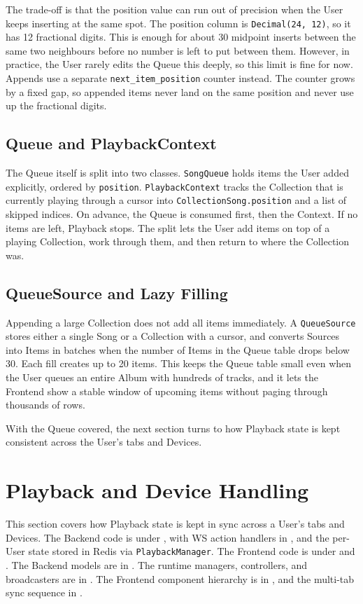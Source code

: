 The trade-off is that the position value can run out of precision
when the User keeps inserting at the same spot. The position column
is \texttt{Decimal(24, 12)}, so it has 12 fractional digits. This is
enough for about 30 midpoint inserts between the same two neighbours
before no number is left to put between them. However, in practice,
the User rarely edits the Queue this deeply, so this limit is fine
for now. Appends use a separate \texttt{next\_item\_position} counter
instead. The counter grows by a fixed gap, so appended items never
land on the same position and never use up the fractional digits.

\subsection{Queue and PlaybackContext}
The Queue itself is split into two classes. \texttt{SongQueue} holds
items the User added explicitly, ordered by \texttt{position}.
\texttt{PlaybackContext} tracks the Collection that is currently
playing through a cursor into \texttt{CollectionSong.position} and a
list of skipped indices. On advance, the Queue is consumed first,
then the Context. If no items are left, Playback stops. The split
lets the User add items on top of a playing Collection, work through
them, and then return to where the Collection was.

\subsection{QueueSource and Lazy Filling}
Appending a large Collection does not add all items immediately.
A \texttt{QueueSource} stores either a single Song or a
Collection with a cursor, and converts Sources into Items in batches
when the number of Items in the Queue table drops below 30. Each
fill creates up to 20 items. This keeps the Queue table small even
when the User queues an entire Album with hundreds of tracks, and
it lets the Frontend show a stable window of upcoming items without
paging through thousands of rows.

With the Queue covered, the next section turns to how Playback state
is kept consistent across the User's tabs and Devices.


\section{Playback and Device Handling}\label{sec:playback}
This section covers how Playback state is kept in sync across a User's
tabs and Devices.
The Backend code is under ,
with WS action handlers in
,
and the per-User state stored in Redis via \texttt{PlaybackManager}.
The Frontend code is under
and .
The Backend models are in
.
The runtime managers, controllers, and broadcasters are in
.
The Frontend component hierarchy is in
,
and the multi-tab sync sequence in
.

